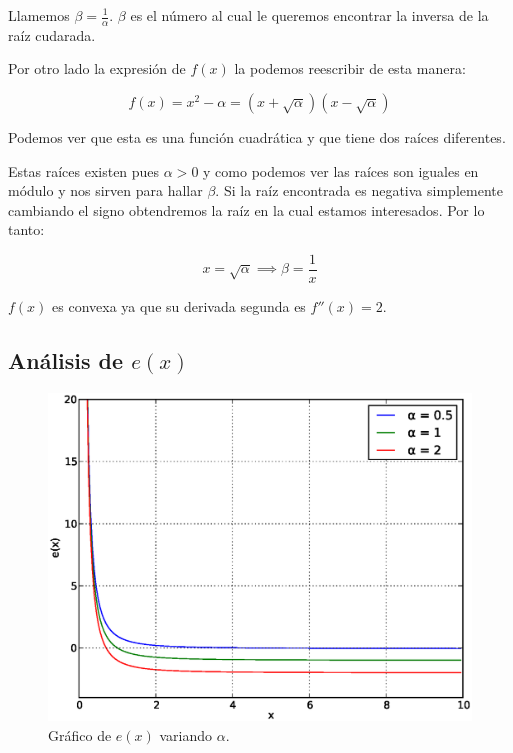 Llamemos $\displaystyle \beta = \frac{ 1 }{ \alpha }$. $\beta$ es el número al
cual le queremos encontrar la inversa de la raíz cudarada.

Por otro lado la expresión de $f(x)$ la podemos reescribir de esta manera:

\[
    f(x) = x^2 - \alpha = (x + \sqrt{\alpha})(x - \sqrt{\alpha})
\]

Podemos ver que esta es una función cuadrática y que tiene dos raíces diferentes.

Estas raíces existen pues $\alpha > 0$ y como podemos ver las raíces son
iguales en módulo y nos sirven para hallar $\beta$. Si la raíz encontrada es
negativa simplemente cambiando el signo obtendremos la raíz en la cual estamos
interesados. Por lo tanto:

\[
    x = \sqrt{\alpha} \implies \beta = \frac{ 1 }{ x }
\]

$f(x)$ es convexa ya que su derivada segunda es $f''(x) = 2$.

\subsection{Análisis de $e(x)$}\label{sec:analisis_e_x}

\begin{figure}[h]
  \begin{center}
    \includegraphics[scale=0.5]{graficos/new/e_x.eps}
    \caption{\label{fig:e_x} Gráfico de $e(x)$ variando $\alpha$.}
  \end{center}
\end{figure}

